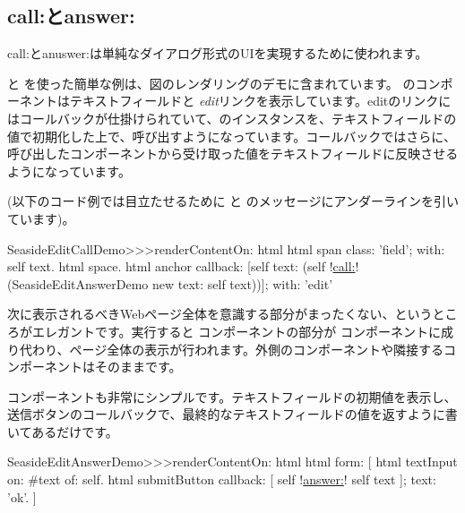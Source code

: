 \documentclass[a4paper,10pt,twoside]{book}
\begin{document}
\subsection{call:とanswer:}

call:とanuswer:は単純なダイアログ形式のUIを実現するために使われます。

  と  を使った簡単な例は、図のレンダリングのデモに含まれています。
  のコンポーネントはテキストフィールドと \emph{edit}リンクを表示しています。editのリンクにはコールバックが仕掛けられていて、のインスタンスを、テキストフィールドの値で初期化した上で、呼び出すようになっています。コールバックではさらに、呼び出したコンポーネントから受け取った値をテキストフィールドに反映させるようになっています。
 
(以下のコード例では目立たせるために  と  のメッセージにアンダーラインを引いています)。

\begin{code}{}
SeasideEditCallDemo>>>renderContentOn: html 
	html span
		class: 'field';
		with: self text.
	html space.
	html anchor
		callback: [self text: (self !\underline{call:}! (SeasideEditAnswerDemo new text: self text))];
		with: 'edit'
\end{code}{}

次に表示されるべきWebページ全体を意識する部分がまったくない、というところがエレガントです。実行すると  コンポーネントの部分が  コンポーネントに成り代わり、ページ全体の表示が行われます。外側のコンポーネントや隣接するコンポーネントはそのままです。


 コンポーネントも非常にシンプルです。テキストフィールドの初期値を表示し、送信ボタンのコールバックで、最終的なテキストフィールドの値を返すように書いてあるだけです。

\begin{code}{}
SeasideEditAnswerDemo>>>renderContentOn: html
	html form: [
		html textInput
			on: #text of: self.
		html submitButton
			callback: [ self !\underline{answer:}! self text ];
			text: 'ok'.
		]
\end{code}{}
\end{document}
